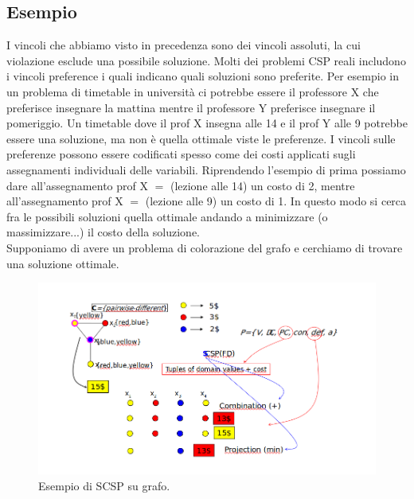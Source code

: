 \subsection{Esempio}
I vincoli che abbiamo visto in precedenza sono dei vincoli assoluti, la cui
violazione esclude una possibile soluzione. Molti dei problemi CSP reali
includono i vincoli preference i quali indicano quali soluzioni sono preferite.
Per esempio in un problema di timetable in università ci potrebbe essere il
professore X che preferisce insegnare la mattina mentre il professore Y
preferisce insegnare il pomeriggio. Un timetable dove il prof X insegna alle 14
e il prof Y alle 9 potrebbe essere una soluzione, ma non è quella ottimale viste
le preferenze. I vincoli sulle preferenze possono essere codificati spesso come
dei costi applicati sugli assegnamenti individuali delle variabili. Riprendendo
l'esempio di prima possiamo dare all'assegnamento prof X $=$ (lezione alle 14)
un costo di 2, mentre all'assegnamento prof X $=$ (lezione alle 9) un costo di
1. In questo modo si cerca fra le possibili soluzioni quella ottimale andando a
minimizzare (o massimizzare...) il costo della soluzione. \\Supponiamo di avere
un problema di colorazione del grafo e cerchiamo di trovare una soluzione
ottimale.

\begin{figure}[htp]
    \centering
    \includegraphics[width=14cm, keepaspectratio]{img/Cap4/scsp2.png}
    \caption{Esempio di SCSP su grafo.}
\end{figure}

